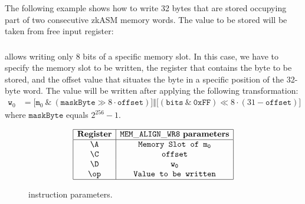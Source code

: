 The following example shows how to write 32 bytes that are stored occupying part of two consecutive zkASM memory words. The value to be stored will be taken from free input register:


\subsubsection{\MEMALIGNWRE}

\MEMALIGNWRE allows writing only 8 bits of a specific memory slot. In this case, we have to specify the memory slot to be written, the register that contains the byte to be stored, and the offset value that situates the byte in a specific position of the 32-byte word. The value will be written after applying the following transformation:
\begin{align*}
    \texttt{w}_0 &= \Bigr[ \texttt{m}_0 \ \texttt{\&} \ \left( \texttt{maskByte} \gg 8 \cdot \texttt{offset} \right) \Bigr]  \mathbin\Vert \Bigr[ \left( \texttt{bits} \ \texttt{\&} \ \texttt{0xFF} \right)  \ll 8 \cdot \left( 31-\texttt{offset}\right) \Bigr] 
\end{align*}
where $\texttt{maskByte}$ equals $2^{256} - 1$. 

\begin{figure}[h!]
    \renewcommand{\figurename}{Table}
    \[
    \begin{array}{|c|c|}
        \hline
        \mathbf{Register} &\mathtt{MEM\_ALIGN\_WR8} \ \textbf{parameters} \\ \hline
        \A & \texttt{Memory Slot of } \mathtt{m_0} \\
        \C & \mathtt{offset} \\
        \D & \mathtt{w_0} \\
        \op& \texttt{Value to be written} \\
        \hline
    \end{array}
    \]
    \caption{\MEMALIGNWRE instruction parameters.}
    \label{tab:memory-first-example}
\end{figure}

